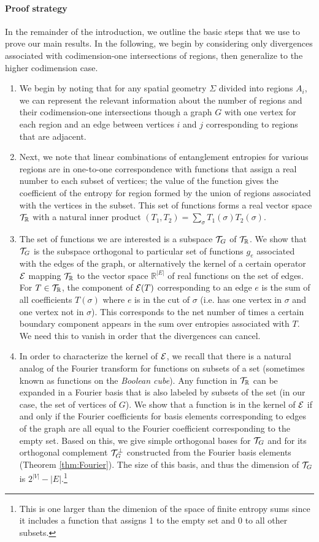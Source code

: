 \documentclass[12pt]{article}
\theoremstyle{definition}
\begin{document}
\paragraph{Proof strategy} In the remainder of the introduction, we outline the basic steps that we use to prove our main results. In the following, we begin by considering only divergences associated with codimension-one intersections of regions, then generalize to the higher codimension case.
\begin{enumerate}
\item We begin by noting that for any spatial geometry $\Sigma$ divided into regions $A_i$, we can represent the relevant information about the number of regions and their codimension-one intersections though a graph $G$ with one vertex for each region and an edge between vertices $i$ and $j$ corresponding to regions that are adjacent.
\item Next, we note that linear combinations of entanglement entropies for various regions are in one-to-one correspondence with functions that assign a real number to each subset of vertices; the value of the function gives the coefficient of the entropy for region formed by the union of regions associated with the vertices in the subset. This set of functions forms a real vector space ${\cal T}_\mathbb{R}$ with a natural inner product $(T_1,T_2) = \sum_\sigma T_1(\sigma) T_2(\sigma)$.
\item 
The set of functions we are interested is a subspace ${\cal T}_G$ of ${\cal T}_\mathbb{R}$. We show that ${\cal T}_G$ is the subspace orthogonal to particular set of functions $g_e$ associated with the edges of the graph, or alternatively the kernel of a certain operator ${\cal E}$ mapping ${\cal T}_\mathbb{R}$ to the vector space $\mathbb{R}^{|E|}$ of real functions on the set of edges. For $T \in {\cal T}_\mathbb{R}$, the component of ${\cal E}(T)$ corresponding to an edge $e$ is the sum of all coefficients $T(\sigma)$ where $e$ is in the cut of $\sigma$ (i.e. has one vertex in $\sigma$ and one vertex not in $\sigma$). This corresponds to the net number of times a certain boundary component appears in the sum over entropies associated with $T$. We need this to vanish in order that the divergences can cancel.
\item 
In order to characterize the kernel of ${\cal E}$, we recall that there is a natural analog of the Fourier transform for functions on subsets of a set (sometimes known as functions on the {\it Boolean cube}). Any function in ${\cal T}_\mathbb{R}$ can be expanded in a Fourier basis that is also labeled by subsets of the set (in our case, the set of vertices of $G$). We show that a function is in the kernel of ${\cal E}$ if and only if the Fourier coefficients for basis elements corresponding to edges of the graph are all equal to the Fourier coefficient corresponding to the empty set. Based on this, we give simple orthogonal bases for ${\cal T}_G$ and for its orthogonal complement ${\cal T}_G^\perp$ constructed from the Fourier basis elements (Theorem \ref{thm:Fourier}). The size of this basis, and thus the dimension of ${\cal T}_G$ is $2^{|V|} - |E|$.\footnote{This is one larger than the dimenion of the space of finite entropy sums since it includes a function that assigns 1 to the empty set and 0 to all other subsets.}

\end{enumerate}
\end{document}

